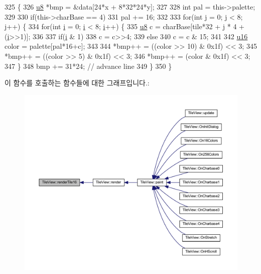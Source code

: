 \begin{DoxyCode}
325 \{
326   \mbox{\hyperlink{_system_8h_aed742c436da53c1080638ce6ef7d13de}{u8}} *bmp = &data[24*x + 8*32*24*y];
327 
328   \textcolor{keywordtype}{int} pal = this->palette;
329 
330   \textcolor{keywordflow}{if}(this->charBase == 4)
331     pal += 16;
332 
333   \textcolor{keywordflow}{for}(\textcolor{keywordtype}{int} j = 0; j < 8; j++) \{
334     \textcolor{keywordflow}{for}(\textcolor{keywordtype}{int} \mbox{\hyperlink{expr-lex_8cpp_acb559820d9ca11295b4500f179ef6392}{i}} = 0; \mbox{\hyperlink{expr-lex_8cpp_acb559820d9ca11295b4500f179ef6392}{i}} < 8; \mbox{\hyperlink{expr-lex_8cpp_acb559820d9ca11295b4500f179ef6392}{i}}++) \{
335       \mbox{\hyperlink{_system_8h_aed742c436da53c1080638ce6ef7d13de}{u8}} c = charBase[tile*32 + j * 4 + (\mbox{\hyperlink{expr-lex_8cpp_acb559820d9ca11295b4500f179ef6392}{i}}>>1)];
336 
337       \textcolor{keywordflow}{if}(\mbox{\hyperlink{expr-lex_8cpp_acb559820d9ca11295b4500f179ef6392}{i}} & 1)
338         c = c>>4;
339       \textcolor{keywordflow}{else}
340         c = c & 15;
341 
342       \mbox{\hyperlink{_system_8h_a9e6c91d77e24643b888dbd1a1a590054}{u16}} color = palette[pal*16+c];
343 
344       *bmp++ = ((color >> 10) & 0x1f) << 3;
345       *bmp++ = ((color >> 5) & 0x1f) << 3;
346       *bmp++ = (color & 0x1f) << 3;
347     \}
348     bmp += 31*24; \textcolor{comment}{// advance line}
349   \}
350 \}
\end{DoxyCode}
이 함수를 호출하는 함수들에 대한 그래프입니다.\+:
\nopagebreak
\begin{figure}[H]
\begin{center}
\leavevmode
\includegraphics[width=350pt]{class_tile_view_abc4f9051fc3c2bfad76a6b11787460f8_icgraph}
\end{center}
\end{figure}
\mbox{\label{class_tile_view_a1232e131b9ef993edea4390809c41814}} 
